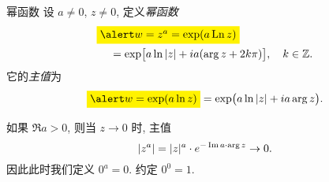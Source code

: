 %
%


\begin{frame}{幂函数}
\onslide<+->
设 $a\neq 0$, $z\neq 0$, 定义\emph{幂函数}
\begin{align*}
&\abox{$w=z^a=\exp(a\Ln z)$}\\
&\hspace{12pt}=\exp\bigl[a\ln|z|+ia(\arg z+2k\pi)\bigr],\quad k\in\BZ.
\end{align*}
\onslide<+->
它的\emph{主值}为
\[\abox{$w=\exp(a\ln z)$}=\exp\bigl(a\ln|z|+ia\arg z\bigr).\]

\onslide<+->
如果 $\Re a>0$, 则当 $z\to 0$ 时, 主值
\[\left|z^a\right|=|z|^a\cdot e^{-\operatorname{Im} a\cdot\arg z}\to 0.\]
\onslide<+->
因此此时我们定义 $0^a=0$.
\onslide<+->
约定 $0^0=1$.
\end{frame}


